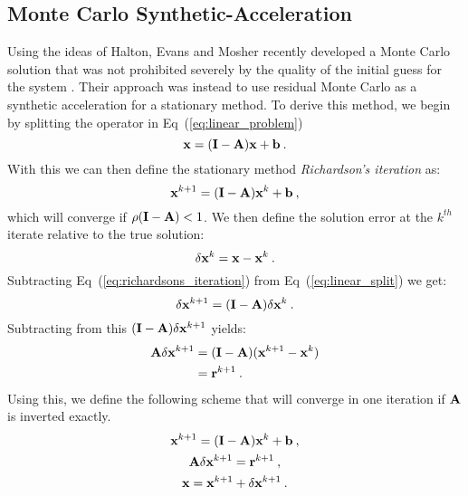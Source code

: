\subsection{Monte Carlo Synthetic-Acceleration}
\label{subsec:mcsa}
Using the ideas of Halton, Evans and Mosher recently developed a Monte
Carlo solution that was not prohibited severely by the quality of the
initial guess for the system \citep{evans_monte_2009}. Their approach
was instead to use residual Monte Carlo as a synthetic acceleration
for a stationary method. To derive this method, we begin by splitting
the operator in Eq~(\ref{eq:linear_problem})
\begin{equation}
  \mathbf{x} = (\mathbf{I} - \mathbf{A})\mathbf{x} + \mathbf{b}\:.
  \label{eq:linear_split}
\end{equation}
With this we can then define the stationary method
\textit{Richardson's iteration} as:
\begin{equation}
  \mathbf{x}^{k+1} = (\mathbf{I} - \mathbf{A})\mathbf{x}^k + \mathbf{b}\:,
  \label{eq:richardsons_iteration}
\end{equation}
which will converge if $\rho(\mathbf{I} - \mathbf{A}) < 1$. We then define the
solution error at the $k^{th}$ iterate relative to the true solution:
\begin{equation}
  \delta \mathbf{x}^k = \mathbf{x} - \mathbf{x}^k\:.
  \label{eq:mcsa_error}
\end{equation}
Subtracting Eq~(\ref{eq:richardsons_iteration}) from
Eq~(\ref{eq:linear_split}) we get:
\begin{equation}
  \delta \mathbf{x}^{k+1} = (\mathbf{I} - \mathbf{A})\delta \mathbf{x}^k\:.
  \label{eq:mcsa_setup_1}
\end{equation}
Subtracting from this $(\mathbf{I} - \mathbf{A})\delta \mathbf{x}^{k+1}$ yields:
\begin{equation}
  \begin{split}
    \mathbf{A}\delta \mathbf{x}^{k+1} &= (\mathbf{I} -
    \mathbf{A})(\mathbf{x}^{k+1}-\mathbf{x}^{k}) \\ &= \mathbf{r}^{k+1}\:.
    \label{eq:mcsa_setup_2}
  \end{split}
\end{equation}
Using this, we define the following scheme that will converge in one
iteration if $\mathbf{A}$ is inverted exactly.
\begin{subequations}
  \begin{gather}
    \mathbf{x}^{k+1} = (\mathbf{I} - \mathbf{A})\mathbf{x}^k + \mathbf{b}\:,\\
    \mathbf{A} \delta \mathbf{x}^{k+1} = \mathbf{r}^{k+1}\:,\\
    \mathbf{x} = \mathbf{x}^{k+1} + \delta \mathbf{x}^{k+1}\:.
  \end{gather}
  \label{eq:mcsa_setup_3}
\end{subequations}
